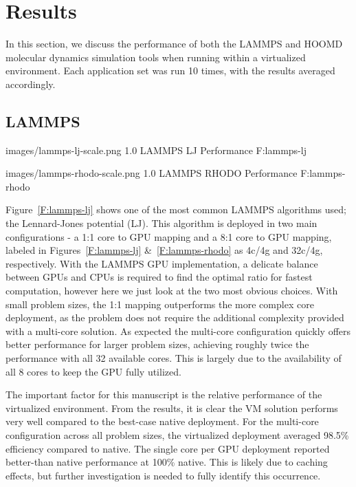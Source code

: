 \documentclass[10pt]{sigplanconf}
\begin{document}
 
\section{Results}\label{results}

In this section, we discuss the performance of both the LAMMPS and HOOMD molecular dynamics simulation tools when running within a virtualized environment. 
Each application set was run 10 times, with the results averaged accordingly. 

\subsection{LAMMPS}


  {images/lammps-lj-scale.png}
  {1.0}
  {LAMMPS LJ Performance}
  {F:lammps-lj}

  {images/lammps-rhodo-scale.png}
  {1.0}
  {LAMMPS RHODO Performance}
  {F:lammps-rhodo}


Figure~\ref{F:lammps-lj} shows one of the most common LAMMPS algorithms used; the Lennard-Jones potential (LJ).  This algorithm is deployed in two main configurations - a 1:1 core to GPU mapping and a 8:1 core to GPU mapping, labeled in Figures~\ref{F:lammps-lj} \&~\ref{F:lammps-rhodo} as 4c/4g and 32c/4g, respectively.  With the LAMMPS GPU implementation, a delicate balance between GPUs and CPUs is required to find the optimal ratio for fastest computation, however here we just look at the two most obvious choices. With small problem sizes, the 1:1 mapping outperforms the more complex core deployment, as the problem does not require the additional complexity provided with a multi-core solution.  As expected the multi-core configuration quickly offers better performance for larger problem sizes, achieving roughly twice the performance with all 32 available cores. 
This is largely due to the availability of all 8 cores to keep the GPU fully utilized.

The important factor for this manuscript is the relative performance of the virtualized environment. From the results, it is clear the VM solution performs very well compared to the best-case native deployment. For the multi-core configuration across all problem sizes, the virtualized deployment averaged 98.5\% efficiency compared to native. The single core per GPU deployment reported better-than native performance at 100\% native.  This is likely due to caching effects, but further investigation is needed to fully identify this occurrence. 
\end{document}
